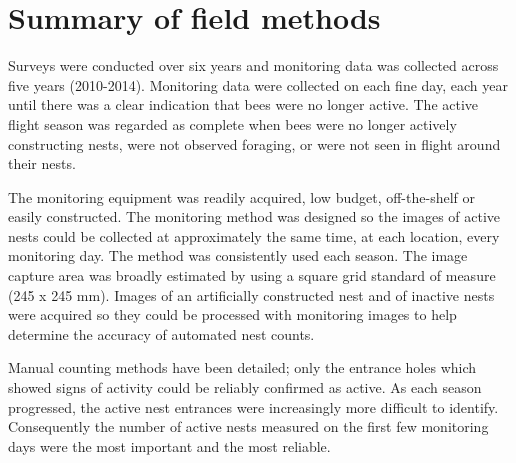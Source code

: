 \section{Summary of field methods}\label{sec:summary-of-field-methods}
Surveys were conducted over six years and monitoring data was collected across five years (2010-2014). Monitoring data were collected on each fine day, each year until there was a clear indication that bees were no longer active. The active flight season was regarded as complete when bees were no longer actively constructing nests, were not observed foraging, or were not seen in flight around their nests.

The monitoring equipment was readily acquired, low budget, off-the-shelf or easily constructed. The monitoring method was designed so the images of active nests could be collected at approximately the same time, at each location, every monitoring day. The method was consistently used each season. The image capture area was broadly estimated by using a square grid standard of measure (245 x 245 mm). Images of an artificially constructed nest and of inactive nests were acquired so they could be processed with monitoring images to help determine the accuracy of automated nest counts.

Manual counting methods have been detailed; only the entrance holes which showed signs of activity could be reliably confirmed as active. As each season progressed, the active nest entrances were increasingly more difficult to identify. Consequently the number of active nests measured on the first few monitoring days were the most important and the most reliable.

